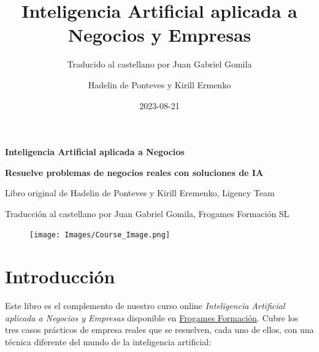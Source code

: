 \documentclass[
]{book}
\title{Inteligencia Artificial aplicada a Negocios y Empresas}
\subtitle{Traducido al castellano por Juan Gabriel Gomila}
\author{Hadelin de Ponteves y Kirill Ermenko}
\date{2023-08-21}
\begin{document}
\maketitle


\begin{titlepage}

\begin{center}

\Huge \textbf{Inteligencia Artificial aplicada a Negocios}

\Large \textbf{Resuelve problemas de negocios reales con soluciones de IA}

\large Libro original de Hadelin de Ponteves y Kirill Eremenko, Ligency Team

\large Traducción al castellano por Juan Gabriel Gomila, Frogames Formación SL


\end{center}

\begin{figure}[!htbp]
		\begin{center}
			\texttt{[image: Images/Course\_Image.png]}
		\end{center}
\end{figure}

\end{titlepage}

{
\setcounter{tocdepth}{1}
\tableofcontents
}
\hypertarget{introducciuxf3n}{%
\chapter*{Introducción}\label{introducciuxf3n}}

Este libro es el complemento de nuestro curso online \emph{Inteligencia Artificial aplicada a Negocios y Empresas} disponible en \href{https://cursos.frogamesformacion.com/courses/ia-aplicada-negocios?coupon=frogames30}{Frogames Formación}. Cubre los tres casos prácticos de empresa reales que se resuelven, cada uno de ellos, con una técnica diferente del mundo de la inteligencia artificial:
\end{document}
